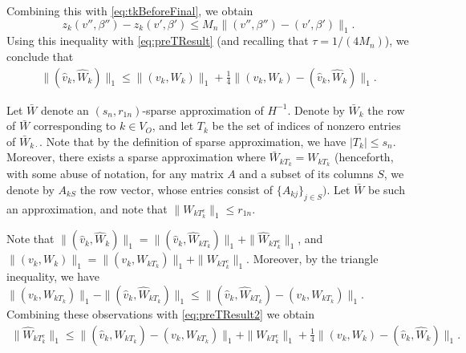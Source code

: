 \documentclass[opre,nonblindrev]{informs3} %
\begin{document}
\begin{APPENDIX}{}
Combining this with \eqref{eq:tkBeforeFinal}, we obtain
\begin{equation}
\label{eq:boundTkFinForm}
z_k(v'',\beta'') - z_k(v',\beta') \leq   M_n \| (v'',\beta'')-(v',\beta') \|_1.
\end{equation}
Using this inequality with \eqref{eq:preTResult} (and recalling that $\tau=1/(4M_n)$), we conclude that
\begin{equation}\label{eq:preTResult2}
\begin{aligned}
\|(\hat v_k,\hat W_k) \|_1    \leq \|(v_k,W_k)\|_1 +
\frac{1}{4}
 \| (v_k,W_k)-(\hat v_k,\hat W_k) \|_1.
\end{aligned}
\end{equation}



Let $\bar{W}$ denote an $(s_n,r_{1n})$-sparse approximation of $H^{-1}$.
Denote by
$\bar{W}_k$ the row of $\bar W$ corresponding to $k\in V_O$, and let
 $T_k$ be the set of indices of nonzero entries of $\bar{W}_{k\cdot}$. Note that by the definition of sparse approximation, we have $|T_k|\leq s_n$.
Moreover, there exists a sparse approximation where
$\bar{W}_{k T_k} = W_{kT_k}$
(henceforth, with some abuse of notation, for any matrix $A$ and a subset of its columns $S$, we denote by $A_{kS}$ the row vector, whose entries consist of 
$\{A_{kj}\}_{j\in S})$. Let $\bar{W}$ be such an approximation,
and note that
$\| {W}_{kT_k^c} \|_1 \leq r_{1n} $.


Note that
$\|(\hat v_k,\hat W_k) \|_1  = \|(\hat v_k,\hat W_{kT_k}) \|_1 + \|\hat W_{kT_k^c} \|_1$,
and
$\|( v_k, W_k) \|_1  = \|( v_k, W_{kT_k}) \|_1 + \| W_{kT_k^c} \|_1$.
Moreover, by the triangle inequality, we have
$\|( v_k, W_{kT_k}) \|_1 - \|(\hat v_k,\hat W_{kT_k}) \|_1 \leq
\|(\hat v_k,\hat W_{kT_k})- ( v_k, W_{kT_k}) \|_1$.
Combining these observations with
\eqref{eq:preTResult2} we obtain
\begin{equation}\label{eq:preTResult3}
\begin{aligned}
 \|\hat W_{kT_k^c} \|_1
   \leq
\|(\hat v_k,\hat W_{kT_k})- ( v_k, W_{kT_k}) \|_1
 + \| W_{kT_k^c} \|_1
   + \frac{1}{4} \| (v_k,W_k)-(\hat v_k,\hat W_k) \|_1.
\end{aligned}
\end{equation}


\end{APPENDIX}
\end{document}

